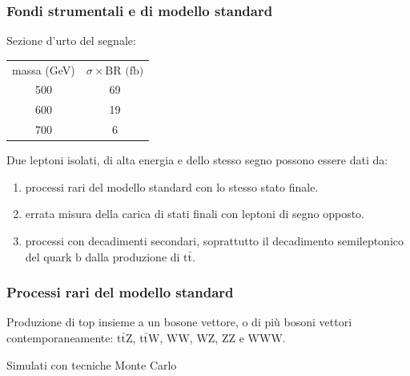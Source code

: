 \documentclass[italian]{beamer}
\begin{document}
\begin{frame}
    \frametitle{Fondi strumentali e di modello standard}
    Sezione d'urto del segnale: 
    \begin{table}
        \centering
        \begin{tabular}{cc}
            massa (GeV) & $\sigma \times \text{BR (fb)}$\\
            500 & 69 \\
            600 & 19 \\
            700 & 6 \\
        \end{tabular}
    \end{table}
    Due leptoni isolati, di alta energia e dello stesso segno possono essere dati da:
    \begin{enumerate}
        \item processi rari del modello standard con lo stesso stato finale.
        \item errata misura della carica di stati finali con leptoni di
            segno opposto.
        \item processi con decadimenti secondari, soprattutto il decadimento
            semileptonico del quark $\mathrm{b}$ dalla produzione di
            $\mathrm{t} \bar{\mathrm{t}}$.  
    \end{enumerate}
\end{frame}

\begin{frame}
    \frametitle{Processi rari del modello standard}
    Produzione di top insieme a un bosone vettore, o di pi\`u bosoni vettori
    contemporaneamente:
    $\mathrm{t} \bar{\mathrm{t}}\mathrm{Z}$, $\mathrm{t}
    \bar{\mathrm{t}} \mathrm{W}$,
                    $\mathrm{WW}$, $\mathrm{WZ}$, $\mathrm{ZZ}$ e
                    $\mathrm{WWW}$.

                    \alert{Simulati con tecniche Monte Carlo}
\end{frame}
\end{document}
